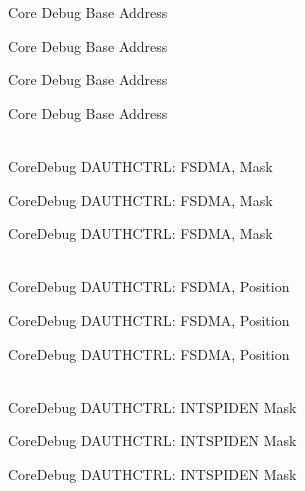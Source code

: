 \begin{DoxyRefList}
\label{deprecated__deprecated000371}%
%
Core Debug Base Address 

\label{deprecated__deprecated000447}%
%
Core Debug Base Address 

\label{deprecated__deprecated000550}%
%
Core Debug Base Address 

\label{deprecated__deprecated000652}%
%
Core Debug Base Address  
\item[{\parbox[t]{\linewidth}{Global \doxylink{group__CMSIS__SCB_gab7f3f76af0236f8d3d3a090f50d4841a}{Core\+Debug\+\_\+\+DAUTHCTRL\+\_\+\+FSDMA\+\_\+\+Msk} }}]\hfill \\
\label{deprecated__deprecated000084}%
%
Core\+Debug DAUTHCTRL:\+ FSDMA, Mask 

\label{deprecated__deprecated000535}%
%
Core\+Debug DAUTHCTRL:\+ FSDMA, Mask 

\label{deprecated__deprecated000637}%
%
Core\+Debug DAUTHCTRL:\+ FSDMA, Mask  
\item[{\parbox[t]{\linewidth}{Global \doxylink{group__CMSIS__SCB_ga2b4fde73cbbbb0adeb686dc20ff705de}{Core\+Debug\+\_\+\+DAUTHCTRL\+\_\+\+FSDMA\+\_\+\+Pos} }}]\hfill \\
\label{deprecated__deprecated000083}%
%
Core\+Debug DAUTHCTRL:\+ FSDMA, Position 

\label{deprecated__deprecated000534}%
%
Core\+Debug DAUTHCTRL:\+ FSDMA, Position 

\label{deprecated__deprecated000636}%
%
Core\+Debug DAUTHCTRL:\+ FSDMA, Position  
\item[{\parbox[t]{\linewidth}{Global \doxylink{group__CMSIS__SCB_ga1570f149a0f89f70fc2644a5842cbcb4}{Core\+Debug\+\_\+\+DAUTHCTRL\+\_\+\+INTSPIDEN\+\_\+\+Msk} }}]\hfill \\
\label{deprecated__deprecated000090}%
%
Core\+Debug DAUTHCTRL:\+ INTSPIDEN Mask 

\label{deprecated__deprecated000144}%
%
Core\+Debug DAUTHCTRL:\+ INTSPIDEN Mask 

\label{deprecated__deprecated000220}%
%
Core\+Debug DAUTHCTRL:\+ INTSPIDEN Mask 


\end{DoxyRefList}
